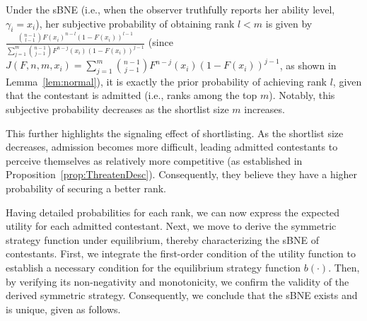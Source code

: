 \begin{remark}\label{rmk:subjectiveProb}
    Under the sBNE (i.e., when the observer truthfully reports her ability level, $\gamma_i=x_i$), her subjective probability of obtaining rank $l<m$ is given by $\frac{\binom{n-1}{l-1}F(x_i)^{n-l}(1-F(x_i))^{l-1}}{\sum_{j=1}^{m}\binom{n-1}{j-1}F^{n-j}(x_i)(1-F(x_i))^{j-1}}$ (since $J(F, n, m, x_i) = \sum_{j=1}^{m}\binom{n-1}{j-1}F^{n-j}(x_i)(1-F(x_i))^{j-1}$, as shown in Lemma~\ref{lem:normal}), it is exactly the prior probability of achieving rank $l$, given that the contestant is admitted (i.e., ranks among the top $m$). Notably, this subjective probability decreases as the shortlist size $m$ increases. 

    This further highlights the signaling effect of shortlisting. As the shortlist size decreases, admission becomes more difficult, leading admitted contestants to perceive themselves as relatively more competitive (as established in Proposition~\ref{prop:ThreatenDesc}). Consequently, they believe they have a higher probability of securing a better rank.
    
    
\end{remark}

Having detailed probabilities for each rank, we can now express the expected utility for each admitted contestant. Next, we move to derive the symmetric strategy function under equilibrium, thereby characterizing the sBNE of contestants. First, we integrate the first-order condition of the utility function to establish a necessary condition for the equilibrium strategy function $b(\cdot)$. Then, by verifying its non-negativity and monotonicity, we confirm the validity of the derived symmetric strategy. Consequently, we conclude that the sBNE exists and is unique, given as follows.


